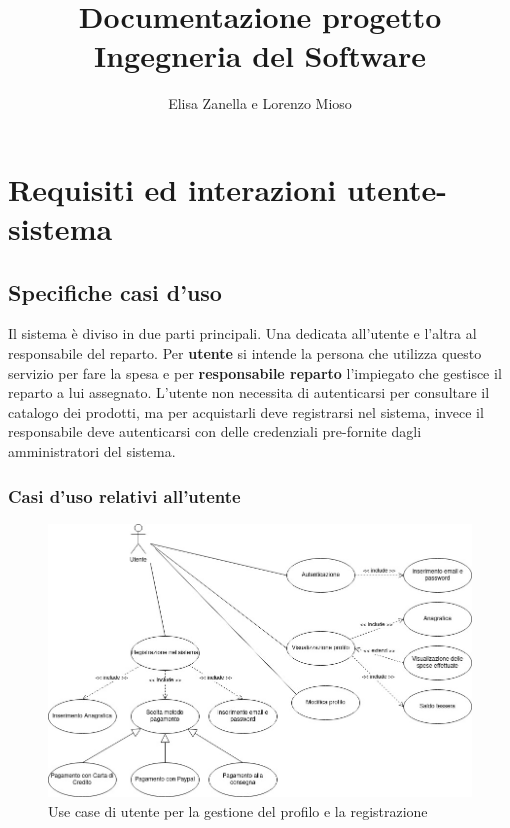 \documentclass{article}
\author{Elisa Zanella e Lorenzo Mioso}
\title{Documentazione progetto Ingegneria del Software}
\begin{document}
\maketitle

\newpage

\tableofcontents

\newpage

\section{Requisiti ed interazioni utente-sistema}

\subsection{Specifiche casi d’uso}

Il sistema è diviso in due parti principali. Una dedicata all'utente e l'altra
al responsabile del reparto. Per \textbf{utente} si intende la persona che utilizza questo
servizio per fare la spesa e per \textbf{responsabile reparto} l'impiegato che gestisce
il reparto a lui assegnato. L’utente non necessita di autenticarsi per consultare il
catalogo dei prodotti, ma per acquistarli deve registrarsi nel sistema, invece il
responsabile deve autenticarsi con delle credenziali pre-fornite dagli amministratori
del sistema.

\subsubsection{Casi d'uso relativi all'utente}

\begin{figure}[h!]
	\centering
	\includegraphics[width=\textwidth]{UseCaseUtenteGestioneProfilo.jpg}
	\caption{Use case di utente per la gestione del profilo e la registrazione}
	\label{fig:UseCaseUtenteGestioneProfilo}
\end{figure}
\end{document}
